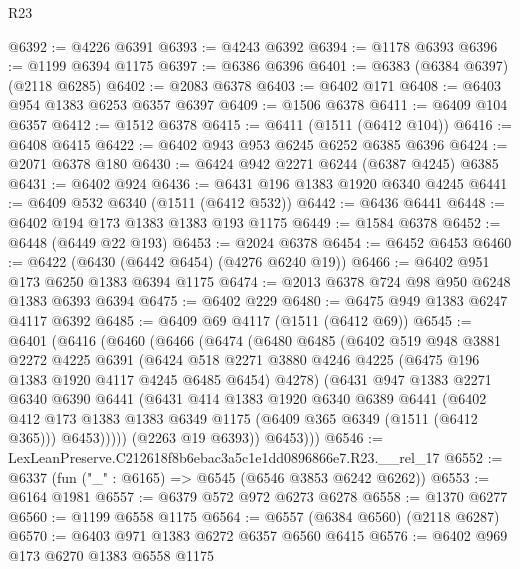 \begin{lexlean}{R23}
\begin{coremodule}
@6392 := @4226 @6391
@6393 := @4243 @6392
@6394 := @1178 @6393
@6396 := @1199 @6394 @1175
@6397 := @6386 @6396
@6401 := @6383 (@6384 @6397) (@2118 @6285)
@6402 := @2083 @6378
@6403 := @6402 @171
@6408 := @6403 @954 @1383 @6253 @6357 @6397
@6409 := @1506 @6378
@6411 := @6409 @104 @6357
@6412 := @1512 @6378
@6415 := @6411 (@1511 (@6412 @104))
@6416 := @6408 @6415
@6422 := @6402 @943 @953 @6245 @6252 @6385 @6396
@6424 := @2071 @6378 @180
@6430 := @6424 @942 @2271 @6244 (@6387 @4245) @6385
@6431 := @6402 @924
@6436 := @6431 @196 @1383 @1920 @6340 @4245
@6441 := @6409 @532 @6340 (@1511 (@6412 @532))
@6442 := @6436 @6441
@6448 := @6402 @194 @173 @1383 @1383 @193 @1175
@6449 := @1584 @6378
@6452 := @6448 (@6449 @22 @193)
@6453 := @2024 @6378
@6454 := @6452 @6453
@6460 := @6422 (@6430 (@6442 @6454) (@4276 @6240 @19))
@6466 := @6402 @951 @173 @6250 @1383 @6394 @1175
@6474 := @2013 @6378 @724 @98 @950 @6248 @1383 @6393 @6394
@6475 := @6402 @229
@6480 := @6475 @949 @1383 @6247 @4117 @6392
@6485 := @6409 @69 @4117 (@1511 (@6412 @69))
@6545 := @6401
    (@6416
      (@6460
        (@6466
          (@6474
            (@6480
              @6485
              (@6402
                @519
                @948
                @3881
                @2272
                @4225
                @6391
                (@6424
                  @518
                  @2271
                  @3880
                  @4246
                  @4225
                  (@6475 @196 @1383 @1920 @4117 @4245 @6485 @6454)
                  @4278)
                (@6431
                  @947
                  @1383
                  @2271
                  @6340
                  @6390
                  @6441
                  (@6431
                    @414
                    @1383
                    @1920
                    @6340
                    @6389
                    @6441
                    (@6402
                      @412
                      @173
                      @1383
                      @1383
                      @6349
                      @1175
                      (@6409 @365 @6349 (@1511 (@6412 @365)))
                      @6453)))))
            (@2263 @19 @6393))
          @6453)))
@6546 := LexLeanPreserve.C212618f8b6ebac3a5c1e1dd0896866e7.R23.__rel_17
@6552 := @6337 (fun ("_" : @6165) => @6545 (@6546 @3853 @6242 @6262))
@6553 := @6164 @1981
@6557 := @6379 @572 @972 @6273 @6278
@6558 := @1370 @6277
@6560 := @1199 @6558 @1175
@6564 := @6557 (@6384 @6560) (@2118 @6287)
@6570 := @6403 @971 @1383 @6272 @6357 @6560 @6415
@6576 := @6402 @969 @173 @6270 @1383 @6558 @1175

\end{coremodule}
\end{lexlean}
